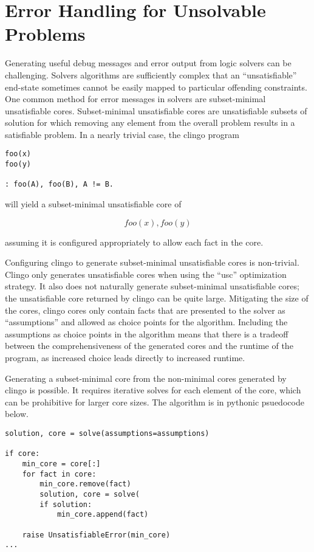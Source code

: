 \section{Error Handling for Unsolvable Problems}
\label{sec:error-handling}

Generating useful debug messages and error output from logic solvers can be challenging.
Solvers algorithms are sufficiently complex that an ``unsatisfiable'' end-state sometimes cannot be easily mapped to particular offending constraints.
One common method for error messages in solvers are subset-minimal unsatisfiable cores.
Subset-minimal unsatisfiable cores are unsatisfiable subsets of solution for which removing any element from the overall problem results in a satisfiable problem.
In a nearly trivial case, the clingo program

\begin{verbatim}
foo(x)
foo(y)

: foo(A), foo(B), A != B.
\end{verbatim}

will yield a subset-minimal unsatisfiable core of

$$ {foo(x), foo(y)} $$

assuming it is configured appropriately to allow each fact in the core.

Configuring clingo to generate subset-minimal unsatisfiable cores is non-trivial.
Clingo only generates unsatisfiable cores when using the ``usc'' optimization strategy.
It also does not naturally generate subset-minimal unsatisfiable cores; the unsatisfiable core returned by clingo can be quite large.
Mitigating the size of the cores, clingo cores only contain facts that are presented to the solver as ``assumptions'' and allowed as choice points for the algorithm.
Including the assumptions as choice points in the algorithm means that there is a tradeoff between the comprehensiveness of the generated cores and the runtime of the program, as increased choice leads directly to increased runtime.

Generating a subset-minimal core from the non-minimal cores generated by clingo is possible.
It requires iterative solves for each element of the core, which can be prohibitive for larger core sizes.
The algorithm is in pythonic psuedocode below.

\begin{verbatim}
solution, core = solve(assumptions=assumptions)

if core:
    min_core = core[:]
    for fact in core:
        min_core.remove(fact)
        solution, core = solve(
        if solution:
            min_core.append(fact)

    raise UnsatisfiableError(min_core)
...
\end{verbatim}

